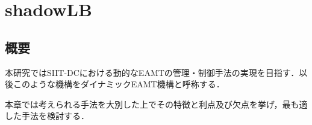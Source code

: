\chapter{shadowLB}
\label{related-shadow}

\section{概要}
本研究ではSIIT-DCにおける動的なEAMTの管理・制御手法の実現を目指す．以後このような機構をダイナミックEAMT機構と呼称する．

本章では考えられる手法を大別した上でその特徴と利点及び欠点を挙げ，最も適した手法を検討する．





